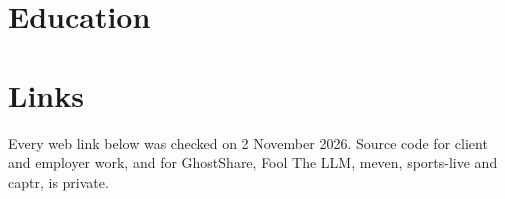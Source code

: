 \section{Education}\label{sec:edu}


\begin{facts}
\end{facts}

\section{Links}\label{sec:links}

Every web link below was checked on 2 November 2026. Source code for client and employer work, and
for GhostShare, Fool The LLM, meven, sports-live and captr, is private.

\newcommand{\linkhead}[1]{\par\vspace{7pt}\noindent\lbl{#1}\par\nopagebreak\vspace{-3pt}\noindent{\color{hair}\rule{\linewidth}{0.4pt}}\par\nopagebreak\vspace{-3pt}}
\newcommand{\lrow}[3]{\noindent\makebox[29mm][l]{#1}\href{#2}{#3}\par}
\newcommand{\srow}[1]{\noindent\href{https://github.com/#1}{#1}\par}

